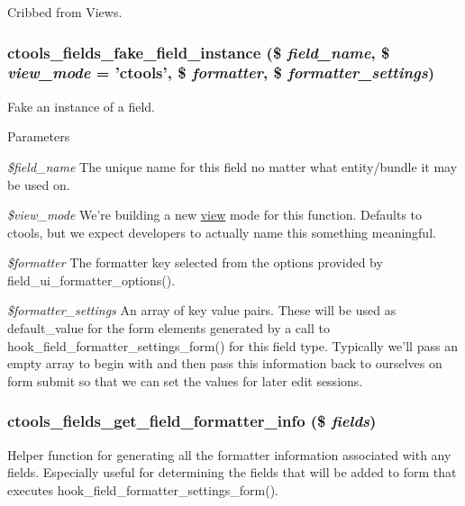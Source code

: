 Cribbed from Views. \hypertarget{fields_8inc_ac6854ba7959279ea2513224ed3375628}{
\subsubsection[{ctools\_\-fields\_\-fake\_\-field\_\-instance}]{\setlength{\rightskip}{0pt plus 5cm}ctools\_\-fields\_\-fake\_\-field\_\-instance (\$ {\em field\_\-name}, \/  \$ {\em view\_\-mode} = {\ttfamily 'ctools'}, \/  \$ {\em formatter}, \/  \$ {\em formatter\_\-settings})}}
\label{fields_8inc_ac6854ba7959279ea2513224ed3375628}
Fake an instance of a field.


\begin{DoxyParams}{Parameters}
\item[{\em \$field\_\-name}]The unique name for this field no matter what entity/bundle it may be used on. \item[{\em \$view\_\-mode}]We're building a new \hyperlink{classview}{view} mode for this function. Defaults to ctools, but we expect developers to actually name this something meaningful. \item[{\em \$formatter}]The formatter key selected from the options provided by field\_\-ui\_\-formatter\_\-options(). \item[{\em \$formatter\_\-settings}]An array of key value pairs. These will be used as default\_\-value for the form elements generated by a call to hook\_\-field\_\-formatter\_\-settings\_\-form() for this field type. Typically we'll pass an empty array to begin with and then pass this information back to ourselves on form submit so that we can set the values for later edit sessions. \end{DoxyParams}
\hypertarget{fields_8inc_a178ae8d6cf7ee3d40a388b1c3e09f896}{
\subsubsection[{ctools\_\-fields\_\-get\_\-field\_\-formatter\_\-info}]{\setlength{\rightskip}{0pt plus 5cm}ctools\_\-fields\_\-get\_\-field\_\-formatter\_\-info (\$ {\em fields})}}
\label{fields_8inc_a178ae8d6cf7ee3d40a388b1c3e09f896}
Helper function for generating all the formatter information associated with any fields. Especially useful for determining the fields that will be added to form that executes hook\_\-field\_\-formatter\_\-settings\_\-form().


